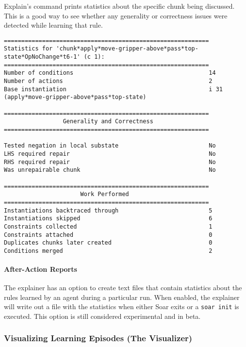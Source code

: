 \textbf{}

Explain's  command prints statistics about the specific chunk being discussed.  This is a good way to see whether any generality or correctness issues were detected while learning that rule.

{\scriptsize
\begin{verbatim}
===========================================================
Statistics for 'chunk*apply*move-gripper-above*pass*top-state*OpNoChange*t6-1' (c 1):
===========================================================
Number of conditions                                       14
Number of actions                                          2
Base instantiation                                         i 31 (apply*move-gripper-above*pass*top-state)

===========================================================
                 Generality and Correctness
===========================================================

Tested negation in local substate                          No
LHS required repair                                        No
RHS required repair                                        No
Was unrepairable chunk                                     No

===========================================================
                      Work Performed
===========================================================
Instantiations backtraced through                          5
Instantiations skipped                                     6
Constraints collected                                      1
Constraints attached                                       0
Duplicates chunks later created                            0
Conditions merged                                          2
\end{verbatim}
}

\paragraph{After-Action Reports}

The explainer has an option to create text files that contain statistics
about the rules learned by an agent during a particular run. When
enabled, the explainer will write out a file with the statistics when
either Soar exits or a \texttt{soar\ init} is executed. This option is
still considered experimental and in beta.

\subsubsection{Visualizing Learning Episodes (The Visualizer)}

